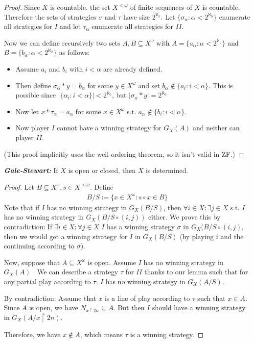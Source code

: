 \documentclass{report}
\newcommand*{\newpar}{\par\vspace{\baselineskip}\noindent}
\newcommand{\tbf}[1]{\textbf{#1}}
\begin{document}
\begin{proof}
 Since $X$ is countable, the set $X^{<\omega}$ of finite sequences of $X$ is countable. Therefore the sets of strategies $\sigma$ and $\tau$ have size $2^{\aleph_0}$. Let $\{\sigma_\alpha : \alpha < 2^{\aleph_0}\}$ enumerate all strategies for $I$ and let $\tau_\alpha$ enumerate all strategies for $II$.
 \newpar
 Now we can define recursively two sets $A,B \subseteq X^\omega$ with $A = \{a_\alpha : \alpha < 2^{\aleph_0}\}$ and $B = \{b_\alpha : \alpha < 2^{\aleph_0}\}$ as follows:
 \begin{itemize}
  \item Assume $a_i$ and $b_i$ with $i < \alpha$ are already defined.
  \item Then define $\sigma_\alpha * y = b_\alpha$ for some $y \in X^\omega$ and set $b_\alpha \notin \{a_i : i < \alpha\}$. This is possible since $|\{\alpha_i : i < \alpha\}| < 2^{\aleph_0}$, but $|\sigma_\alpha  * y| = 2^{\aleph_0}$
  \item Now let $x * \tau_\alpha = a_\alpha$ for some $x \in X^\omega$ s.t. $a_\alpha \notin \{b_i : i < \alpha\}$.
  \item Now player $I$ cannot have a winning strategy for $G_X(A)$ and neither can player $II$.
 \end{itemize}
 (This proof implicitly uses the well-ordering theorem, so it isn't valid in ZF.)
\end{proof}
\begin{theorem}
 \emph{\tbf{Gale-Stewart:}} If $X$ is open or closed, then $X$ is determined.
\end{theorem}
\begin{proof}
 Let $B \subseteq X^\omega, s \in X^{<\omega}$. Define 
 \begin{align*}
  B / S := \{x \in X^\omega : s \circ x \in B\}
 \end{align*}
 Note that if $I$ has no winning strategy in $G_X(B / S)$, then $\forall i \in X : \exists j \in X$ s.t. $I$ has no winning strategy in $G_X(B / S \circ (i,j))$ either. We prove this by contradiction: If $\exists i \in X : \forall j \in X$ $I$ has a winning strategy $\sigma$ in $G_X(B/S \circ (i,j)$, then we would get a winning strategy for $I$ in $G_X(B/S)$ (by playing $i$ and the continuing according to $\sigma$).
 \newpar
 Now, suppose that $A \subseteq X^\omega$ is open. Assume $I$ has no winning strategy in $G_X(A)$
 . We can describe a strategy $\tau$ for $II$ thanks to our lemma such that for any partial play according to $\tau$, $I$ has no winning strategy in $G_X(A/S)$.
 \newpar
 By contradiction: Assume that $x$ is a line of play according to $\tau$ such that $x \in A$. Since $A$ is open, we have $N_{x \upharpoonright 2n} \subseteq A$. But then $I$ should have a winning strategy in $G_X(A / x \upharpoonright 2n)$.
 \newpar
 Therefore, we have $x \notin A$, which means $\tau$ is a winning strategy.
\end{proof}

%
%
%
%
%
%
%
%
%
%
%
\end{document}
